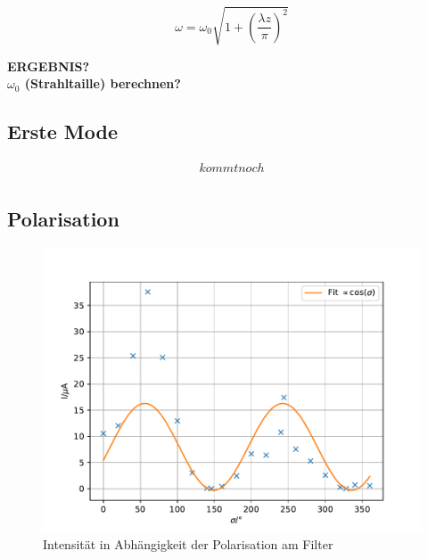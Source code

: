 \begin{equation*}
\omega= \omega_{0} \sqrt{1+ (\frac{\lambda z}{\pi})^2}
\end{equation*}

\textbf{ERGEBNIS?\\
$\omega_0$ (Strahltaille) berechnen?}
\FloatBarrier

\subsection{Erste Mode}

\begin{align*}
kommt noch\\
\end{align*}

\subsection{Polarisation}

\begin{figure}
  \centering
  \includegraphics[width=\textwidth]{polarisation.pdf}
  \caption{Intensität in Abhängigkeit der Polarisation am Filter}
  \label{fig:polarisation}
\end{figure}

\FloatBarrier
